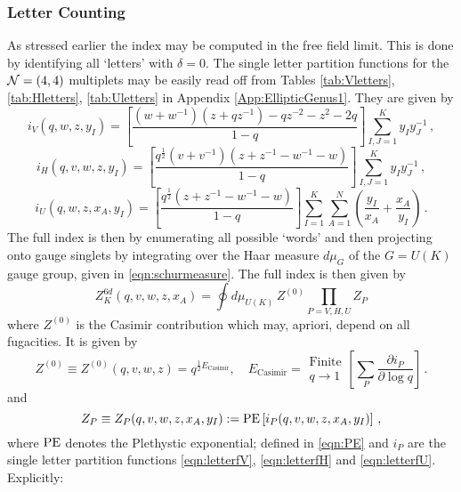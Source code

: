 \documentclass[main.tex]{subfiles}
\begin{document}
\subsubsection{Letter Counting}
As stressed earlier the index may be computed in the free field limit. This is done by identifying all `letters' with $\delta=0$. The single letter partition functions for the $\mathcal{N}=(4,4)$ multiplets may be easily read off from Tables \ref{tab:Vletters}, \ref{tab:Hletters}, \ref{tab:Uletters} in Appendix \ref{App:EllipticGenus1}. They are given by
\begin{equation}
i_V(q,w,z,y_I)=\left[\frac{\left(w+w^{-1}\right)\left(z+qz^{-1}\right)-qz^{-2}-z^2-2q}{1-q}\right]\sum_{I,J=1}^Ky_Iy_J^{-1}\,,\label{eqn:letterfV}
\end{equation}
\begin{equation}
i_H(q,v,w,z,y_I)=\left[\frac{q^{\frac{1}{2}}\left(v+v^{-1}\right)\left(z+z^{-1}-w^{-1}-w\right)}{1-q}\right]\sum_{I,J=1}^Ky_Iy_J^{-1}\,,\label{eqn:letterfH}
\end{equation}
\begin{equation}
i_U(q,w,z,x_A,y_I)=\left[\frac{q^{\frac{1}{2}}\left(z+z^{-1}-w^{-1}-w\right)}{1-q}\right]\sum_{I=1}^K\sum_{A=1}^N\left(\frac{y_I}{x_A}+\frac{x_A}{y_I}\right)\label{eqn:letterfU}\,.
\end{equation}
The full index is then by enumerating all possible `words' and then projecting onto gauge singlets by integrating over the Haar measure $d\mu_G$ of the $G=U(K)$ gauge group, given in \eqref{eqn:schurmeasure}. The full index is then given by
\begin{equation}
Z^{6d}_K(q,v,w,z,x_A)=\oint d\mu_{U(K)} \,Z^{(0)}\prod_{P=V,H,U}Z_{P}
\end{equation}
where $Z^{(0)}$ is the Casimir contribution which may, apriori, depend on all fugacities. It is given by \cite{Benini:2011nc,Kim:2009wb,Imamura:2011su,Rastelli:2016tbz,Bobev:2015kza,Assel:2015nca,Ardehali:2015bla,Kim:2012ava}
\begin{equation}\label{eqn:casimir}
Z^{(0)}\equiv Z^{(0)}(q,v,w,z)=q^{\frac{1}{2}E_{\text{Casimir}}},\quad E_{\text{Casimir}}=\substack{\text{Finite}\\q\to1}\left[\sum_{P}\frac{\partial i_{P}}{\partial\log q}\right]\,.
\end{equation}
and
\begin{equation}\label{eqn:singpartfunction}
Z_{P}\equiv Z_{P}(q,v,w,z,x_A,y_I):=\operatorname{\mathrm{PE}}\left[i_{P}(q,v,w,z,x_A,y_I)\right]\,,
\end{equation}
where $\operatorname{\mathrm{PE}}$ denotes the Plethystic exponential; defined in \eqref{eqn:PE} and $i_{P}$ are the single letter partition functions \eqref{eqn:letterfV}, \eqref{eqn:letterfH} and \eqref{eqn:letterfU}. Explicitly:
\end{document}
